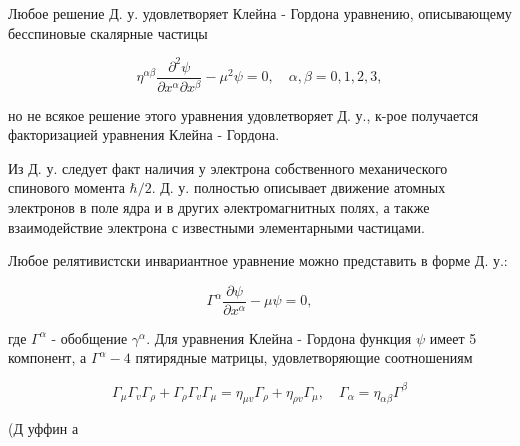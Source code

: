 \documentclass[10pt]{article}
\begin{document}
Любое решение Д. у. удовлетворяет Клейна - Гордона уравнению, описывающему бесспиновые скалярные частицы



\[

\eta^{\alpha \beta} \frac{\partial^{2} \psi}{\partial x^{\alpha} \partial x^{\beta}}-\mu^{2} \psi=0, \quad \alpha, \beta=0,1,2,3,

\]



но не всякое решение этого уравнения удовлетворяет Д. у., к-рое получается факторизацией уравнения Клейна - Гордона.



Из Д. у. следует факт наличия у электрона собственного механического спинового момента $\hbar / 2$. Д. у. полностью описывает движение атомных электронов в поле ядра и в других әлектромагнитных полях, а также взаимодействие электрона с известными элементарными частицами.



Любое релятивистски инвариантное уравнение можно представить в форме Д. у.:



\[

\Gamma^{\alpha} \frac{\partial \psi}{\partial x^{\alpha}}-\mu \psi=0,

\]



где $\Gamma^{\alpha}$ - обобщение $\gamma^{\alpha}$. Для уравнения Клейна - Гордона функция $\psi$ имеет 5 компонент, а $\Gamma^{\alpha}-4$ пятирядные матрицы, удовлетворяющие соотношениям



\[

\Gamma_{\mu} \Gamma_{v} \Gamma_{\rho}+\Gamma_{\rho} \Gamma_{v} \Gamma_{\mu}=\eta_{\mu v} \Gamma_{\rho}+\eta_{\rho v} \Gamma_{\mu}, \quad \Gamma_{\alpha}=\eta_{\alpha \beta} \Gamma^{\beta}

\]



(Д уффин а
\end{document}
